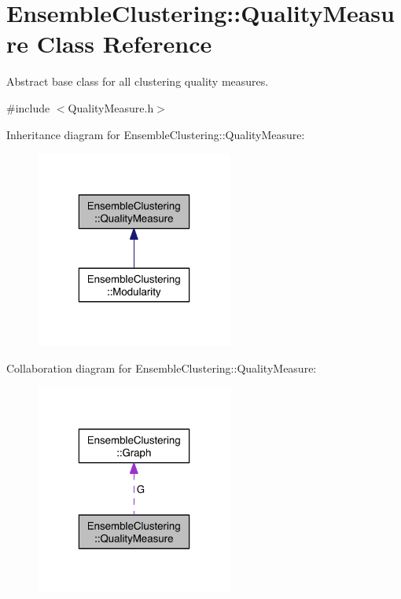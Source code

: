 \hypertarget{class_ensemble_clustering_1_1_quality_measure}{\section{Ensemble\-Clustering\-:\-:Quality\-Measure Class Reference}
\label{class_ensemble_clustering_1_1_quality_measure}
}


Abstract base class for all clustering quality measures.  




{\ttfamily \#include $<$Quality\-Measure.\-h$>$}



Inheritance diagram for Ensemble\-Clustering\-:\-:Quality\-Measure\-:\nopagebreak
\begin{figure}[H]
\begin{center}
\leavevmode
\includegraphics[width=184pt]{class_ensemble_clustering_1_1_quality_measure__inherit__graph}
\end{center}
\end{figure}


Collaboration diagram for Ensemble\-Clustering\-:\-:Quality\-Measure\-:\nopagebreak
\begin{figure}[H]
\begin{center}
\leavevmode
\includegraphics[width=184pt]{class_ensemble_clustering_1_1_quality_measure__coll__graph}
\end{center}
\end{figure}
